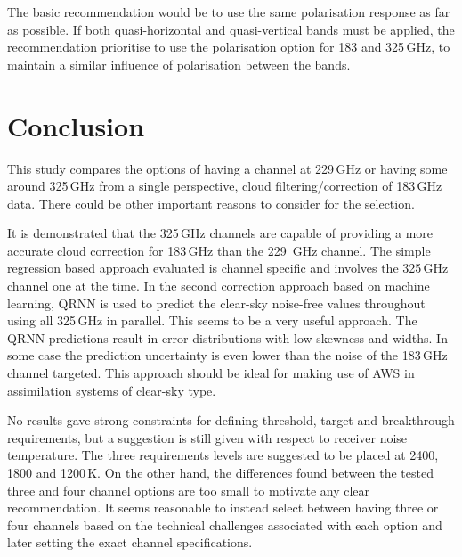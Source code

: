 \documentclass[12pt]{article}
\begin{document}
The basic recommendation would be to use the same polarisation response as far
as possible. If both quasi-horizontal and quasi-vertical bands must be applied,
the recommendation prioritise to use the polarisation option for 183 and
325\,GHz, to maintain a similar influence of polarisation between the bands.


\section{Conclusion}
%
This study compares the options of having a channel at 229\,GHz or having some
around 325\,GHz from a single perspective, cloud filtering/correction of
183\,GHz data. There could be other important reasons to consider for the
selection.

It is demonstrated that the 325\,GHz channels are capable of providing a more
accurate cloud correction for 183\,GHz than the 229 \,GHz channel. The simple
regression based approach evaluated is channel specific and involves the
325\,GHz channel one at the time. In the second correction approach based on
machine learning, QRNN is used to predict the clear-sky noise-free values
throughout using all 325\,GHz in parallel. This seems to be a very useful
approach. The QRNN predictions result in error distributions with low skewness
and widths. In some case the prediction uncertainty is even lower than the
noise of the 183\,GHz channel targeted. This approach should be ideal for
making use of AWS in assimilation systems of clear-sky type.

No results gave strong constraints for defining threshold, target and
breakthrough requirements, but a suggestion is still given with respect to
receiver noise temperature. The three requirements levels are suggested to be
placed at 2400, 1800 and 1200\,K. On the other hand, the differences found
between the tested three and four channel options are too small to motivate any
clear recommendation. It seems reasonable to instead select between having
three or four channels based on the technical challenges associated with each
option and later setting the exact channel specifications.


{\footnotesize

}
\end{document}
